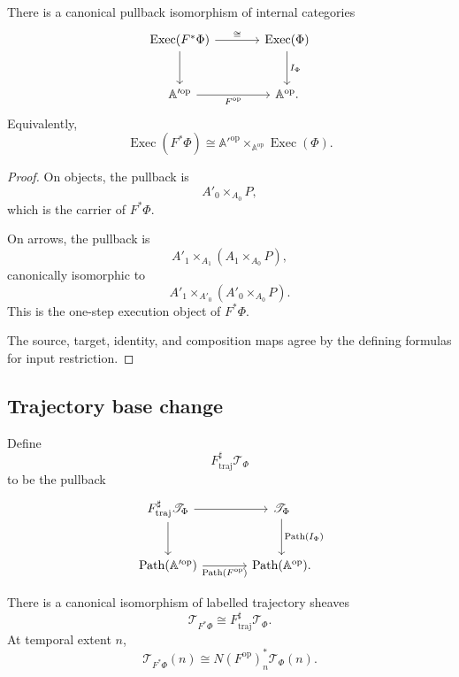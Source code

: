 \begin{theorem}
\label{thm:execution-category-base-change}
There is a canonical pullback isomorphism of internal categories
\[
\begin{tikzcd}[column sep=large,row sep=large]
    \operatorname{Exec}(F^\ast\Phi)
        \arrow[r, "\cong"]
        \arrow[d]
    &
    \operatorname{Exec}(\Phi)
        \arrow[d, "I_\Phi"]
    \\
    \mathbb A'^{\mathrm{op}}
        \arrow[r, "F^{\mathrm{op}}"']
    &
    \mathbb A^{\mathrm{op}}.
\end{tikzcd}
\]
Equivalently,
\[
    \operatorname{Exec}(F^\ast\Phi)
    \cong
    \mathbb A'^{\mathrm{op}}
    \times_{\mathbb A^{\mathrm{op}}}
    \operatorname{Exec}(\Phi).
\]
\end{theorem}

\begin{proof}
On objects, the pullback is
\[
    A'_0\times_{A_0}P,
\]
which is the carrier of \(F^\ast\Phi\).

On arrows, the pullback is
\[
    A'_1
    \times_{A_1}
    \left(
        A_1\times_{A_0}P
    \right),
\]
canonically isomorphic to
\[
    A'_1\times_{A'_0}
    \left(
        A'_0\times_{A_0}P
    \right).
\]
This is the one-step execution object of \(F^\ast\Phi\).

The source, target, identity, and composition maps agree by the defining
formulas for input restriction.
\end{proof}

\subsection{Trajectory base change}
\label{subsec:trajectory-base-change-theorem}

Define
\[
    F^\sharp_{\mathrm{traj}}\mathscr T_\Phi
\]
to be the pullback
\[
\begin{tikzcd}[column sep=large,row sep=large]
    F^\sharp_{\mathrm{traj}}\mathscr T_\Phi
        \arrow[r]
        \arrow[d]
    &
    \mathscr T_\Phi
        \arrow[d, "\operatorname{Path}(I_\Phi)"]
    \\
    \operatorname{Path}(\mathbb A'^{\mathrm{op}})
        \arrow[r, "\operatorname{Path}(F^{\mathrm{op}})"']
    &
    \operatorname{Path}(\mathbb A^{\mathrm{op}}).
\end{tikzcd}
\]

\begin{theorem}
\label{thm:trajectory-base-change}
There is a canonical isomorphism of labelled trajectory sheaves
\[
    \mathscr T_{F^\ast\Phi}
    \cong
    F^\sharp_{\mathrm{traj}}\mathscr T_\Phi.
\]
At temporal extent \(n\),
\[
    \mathscr T_{F^\ast\Phi}(n)
    \cong
    N(F^{\mathrm{op}})_n^\ast
    \mathscr T_\Phi(n).
\]
\end{theorem}


